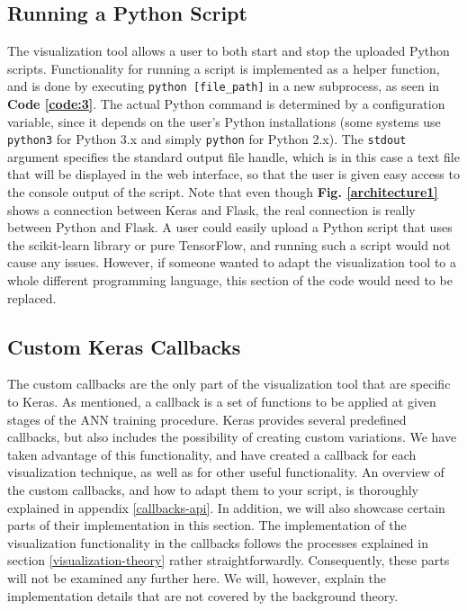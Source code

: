 \subsection{Running a Python Script}

The visualization tool allows a user to both start and stop the uploaded Python scripts. Functionality for running a script is implemented as a helper function, and is done by executing \texttt{python [file\_path]} in a new subprocess, as seen in \textbf{Code \ref{code:3}}. The actual Python command is determined by a configuration variable, since it depends on the user's Python installations (some systems use \texttt{python3} for Python 3.x and simply \texttt{python} for Python 2.x). The \texttt{stdout} argument specifies the standard output file handle, which is in this case a text file that will be displayed in the web interface, so that the user is given easy access to the console output of the script. Note that even though \textbf{Fig. \ref{architecture1}} shows a connection between Keras and Flask, the real connection is really between Python and Flask. A user could easily upload a Python script that uses the scikit-learn library or pure TensorFlow, and running such a script would not cause any issues. However, if someone wanted to adapt the visualization tool to a whole different programming language, this section of the code would need to be replaced.


\subsection{Custom Keras Callbacks}

The custom callbacks are the only part of the visualization tool that are specific to Keras. As mentioned, a callback is a set of functions to be applied at given stages of the ANN training procedure. Keras provides several predefined callbacks, but also includes the possibility of creating custom variations. We have taken advantage of this functionality, and have created a callback for each visualization technique, as well as for other useful functionality. An overview of the custom callbacks, and how to adapt them to your script, is thoroughly explained in appendix \ref{callbacks-api}. In addition, we will also showcase certain parts of their implementation in this section. The implementation of the visualization functionality in the callbacks follows the processes explained in section \ref{visualization-theory} rather straightforwardly. Consequently, these parts will not be examined any further here. We will, however, explain the implementation details that are not covered by the background theory. 


